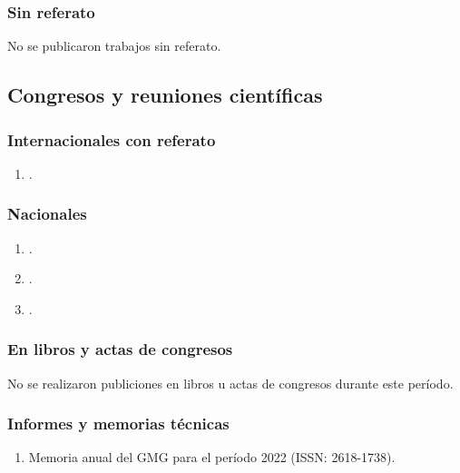 \documentclass[a4paper,11pt,twoside,final,titlepage,onecolumn,openright]{report}
\begin{document}
\subsubsection{Sin referato}
No se publicaron trabajos sin referato.

\subsection{Congresos y reuniones científicas} 

\subsubsection{Internacionales con referato}
\begin{enumerate}
    \item {}.
\end{enumerate}

\subsubsection{Nacionales}

\begin{enumerate}
    \item {}.
    \item {}.
    \item {}.
\end{enumerate}

\subsubsection{En libros y actas de congresos}

No se realizaron publiciones en libros u actas de congresos durante este período.

\subsubsection{Informes y memorias técnicas}
\begin{enumerate}
 \item Memoria anual del GMG para el período 2022 (ISSN: 2618-1738).
\end{enumerate}
\vspace{0.25cm}
\end{document}
